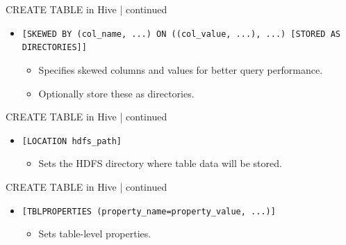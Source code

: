   \begin{frame}{CREATE TABLE in Hive | continued}
	\begin{tcolorbox}[colback=white,colframe=black,title= Part 5: Data Skewing]
		\small
	\begin{itemize}
	  \item \texttt{[SKEWED BY (col\_name, ...) ON ((col\_value, ...), ...) [STORED AS DIRECTORIES]]}
	  \begin{itemize}
		\item Specifies skewed columns and values for better query performance.
		\item Optionally store these as directories.
	  \end{itemize}
	\end{itemize}
	\end{tcolorbox}
  \end{frame}
  

  
  \begin{frame}{CREATE TABLE in Hive | continued}
	\begin{tcolorbox}[colback=white,colframe=black,title= Part 8: Table Location]
		\small
	\begin{itemize}
	  \item \texttt{[LOCATION hdfs\_path]}
	  \begin{itemize}
		\item Sets the HDFS directory where table data will be stored.
	  \end{itemize}
	\end{itemize}
	\end{tcolorbox}	
  \end{frame}
  
  \begin{frame}{CREATE TABLE in Hive | continued}
	\begin{tcolorbox}[colback=white,colframe=black,title= Part 9: Table Properties]
		\small
	\begin{itemize}
	  \item \texttt{[TBLPROPERTIES (property\_name=property\_value, ...)]}
	  \begin{itemize}
		\item Sets table-level properties.
	  \end{itemize}
	\end{itemize}
	\end{tcolorbox}
  \end{frame}
  
